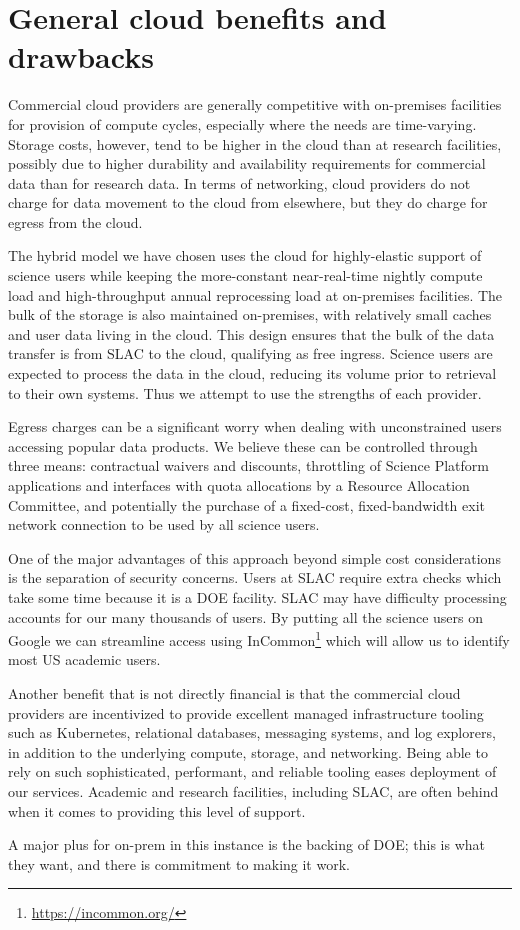 \section{General cloud benefits and drawbacks} \label{sec:tradeoffs}

Commercial cloud providers are generally competitive with on-premises facilities for provision of compute cycles, especially where the needs are time-varying.
Storage costs, however, tend to be higher in the cloud than at research facilities, possibly due to higher durability and availability requirements for commercial data than for research data.
In terms of networking, cloud providers do not charge for data movement to the cloud from elsewhere, but they do charge for egress from the cloud.

The hybrid model we have chosen uses the cloud for highly-elastic support of science users while keeping the more-constant near-real-time nightly compute load and high-throughput annual reprocessing load at on-premises facilities.
The bulk of the storage is also maintained on-premises, with relatively small caches and user data living in the cloud.
This design ensures that the bulk of the data transfer is from SLAC to the cloud, qualifying as free ingress.
Science users are expected to process the data in the cloud, reducing its volume prior to retrieval to their own systems.
Thus we attempt to use the strengths of each provider.

Egress charges can be a significant worry when dealing with unconstrained users accessing popular data products.
We believe these can be controlled through three means: contractual waivers and discounts, throttling of Science Platform applications and interfaces with quota allocations by a Resource Allocation Committee, and potentially the purchase of a fixed-cost, fixed-bandwidth exit network connection to be used by all science users.

One of the major advantages of this approach beyond simple cost considerations is the separation of security concerns.
Users at SLAC require extra checks which take some time because it is a DOE facility.
SLAC may have difficulty processing accounts for our many thousands of users.
By putting all the science users on Google we can streamline access using InCommon\footnote{\url{https://incommon.org/}} which will allow us to identify most US academic users.

Another benefit that is not directly financial is that the commercial cloud providers are incentivized to provide excellent managed infrastructure tooling such as Kubernetes, relational databases, messaging systems, and log explorers, in addition to the underlying compute, storage, and networking.
Being able to rely on such sophisticated, performant, and reliable tooling eases deployment of our services.
Academic and research facilities, including SLAC, are often behind when it comes to providing this level of support.

A major plus for on-prem in this instance is the backing of DOE; this is what they want, and there is commitment to making it work.
